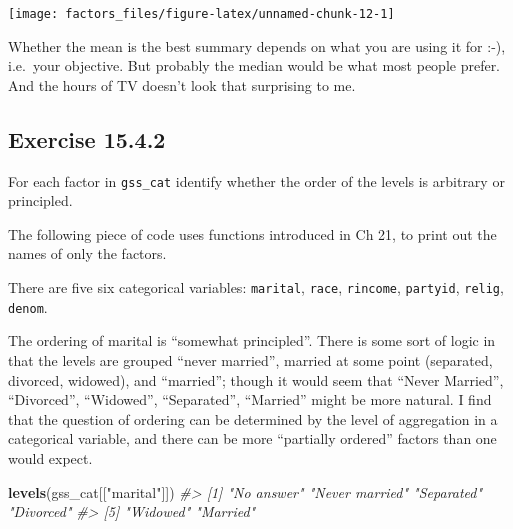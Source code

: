 \documentclass[]{book}
\newenvironment{Shaded}{\begin{snugshade}}{\end{snugshade}}
\newcommand{\CommentTok}[1]{\textcolor[rgb]{0.56,0.35,0.01}{\textit{#1}}}
\newcommand{\KeywordTok}[1]{\textcolor[rgb]{0.13,0.29,0.53}{\textbf{#1}}}
\newcommand{\NormalTok}[1]{#1}
\newcommand{\OperatorTok}[1]{\textcolor[rgb]{0.81,0.36,0.00}{\textbf{#1}}}
\newcommand{\StringTok}[1]{\textcolor[rgb]{0.31,0.60,0.02}{#1}}
\theoremstyle{plain}
\theoremstyle{remark}
\theoremstyle{definition}
\theoremstyle{definition}
\theoremstyle{definition}
\theoremstyle{remark}
\begin{document}
\begin{center}\texttt{[image: factors\_files/figure-latex/unnamed-chunk-12-1]} \end{center}

Whether the mean is the best summary depends on what you are using it
for :-), i.e.~your objective. But probably the median would be what most
people prefer. And the hours of TV doesn't look that surprising to me.

\hypertarget{exercise-15.4.2}{%
\subsection*{\texorpdfstring{Exercise
{15.4.2}}{Exercise 15.4.2}}\label{exercise-15.4.2}}

For each factor in \texttt{gss\_cat} identify whether the order of the
levels is arbitrary or principled.

The following piece of code uses functions introduced in Ch 21, to print
out the names of only the factors.

\begin{Shaded}
\end{Shaded}

There are five six categorical variables: \texttt{marital},
\texttt{race}, \texttt{rincome}, \texttt{partyid}, \texttt{relig},
\texttt{denom}.

The ordering of marital is ``somewhat principled''. There is some sort
of logic in that the levels are grouped ``never married'', married at
some point (separated, divorced, widowed), and ``married''; though it
would seem that ``Never Married'', ``Divorced'', ``Widowed'',
``Separated'', ``Married'' might be more natural. I find that the
question of ordering can be determined by the level of aggregation in a
categorical variable, and there can be more ``partially ordered''
factors than one would expect.

\begin{Shaded}
\begin{Highlighting}[]
\KeywordTok{levels}\NormalTok{(gss_cat[[}\StringTok{"marital"}\NormalTok{]])}
\CommentTok{#> [1] "No answer"     "Never married" "Separated"     "Divorced"     }
\CommentTok{#> [5] "Widowed"       "Married"}
\end{Highlighting}
\end{Shaded}
\end{document}
